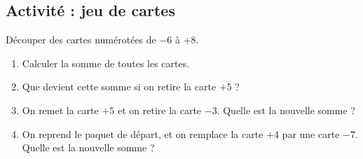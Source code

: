

\subsection*{Activité : jeu de cartes}

Découper des cartes numérotées de \( -6\) à \( +8\).

\begin{enumerate}
    \item
        Calculer la somme de toutes les cartes.
    \item
        Que devient cette somme si on retire la carte \( +5\) ?
    \item
        On remet la carte \( +5\) et on retire la carte \( -3\). Quelle est la nouvelle somme ?
    \item
        On reprend le paquet de départ, et on remplace la carte \( +4\) par une carte \( -7\). Quelle est la nouvelle somme ?
\end{enumerate}
